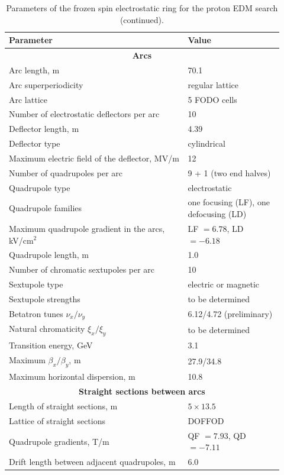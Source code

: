 \documentclass[%
  aps,
  pra,
  preprint,
  a4paper,
  amsmath,
  amssymb,
  floatfix,
  longbibliography,
  superscriptaddress
]{revtex4-2}
\begin{document}
\begin{table}[!htbp]
  \caption{Parameters of the frozen spin electrostatic ring for the proton
    EDM search (continued).}
  \label{tab:pring-cont}
  \centering
  \renewcommand{\baselinestretch}{1}\small\selectfont
  \begin{tabular}{@{}p{0.60\linewidth}@{\hspace{1em}}p{0.32\linewidth}@{}}
    \toprule
    Parameter & Value \\
    \midrule
    \multicolumn{2}{c}{\textbf{Arcs}} \\
    \midrule
    Arc length, m & 70.1 \\
    Arc superperiodicity & regular lattice \\
    Arc lattice & 5 FODO cells \\
    Number of electrostatic deflectors per arc & 10 \\
    Deflector length, m & 4.39 \\
    Deflector type & cylindrical \\
    Maximum electric field of the deflector, MV/m & 12 \\
    Number of quadrupoles per arc & 9 + 1 (two end halves) \\
    Quadrupole type & electrostatic \\
    Quadrupole families & one focusing (LF), one defocusing (LD) \\
    Maximum quadrupole gradient in the arcs, kV/cm$^2$
      & LF $= 6.78$, LD $= -6.18$ \\
    Quadrupole length, m & 1.0 \\
    Number of chromatic sextupoles per arc & 10 \\
    Sextupole type & electric or magnetic \\
    Sextupole strengths & to be determined \\
    Betatron tunes $\nu_x/\nu_y$ & 6.12/4.72 (preliminary) \\
    Natural chromaticity $\xi_x/\xi_y$ & to be determined \\
    Transition energy, GeV & 3.1 \\
    Maximum $\beta_x/\beta_y$, m & 27.9/34.8 \\
    Maximum horizontal dispersion, m & 10.8 \\
    \midrule
    \multicolumn{2}{c}{\textbf{Straight sections between arcs}} \\
    \midrule
    Length of straight sections, m & $5\times 13.5$ \\
    Lattice of straight sections & DOFFOD \\
    Quadrupole gradients, T/m & QF $= 7.93$, QD $= -7.11$ \\
    Drift length between adjacent quadrupoles, m & 6.0 \\
    \bottomrule
  \end{tabular}
\end{table}
\end{document}
